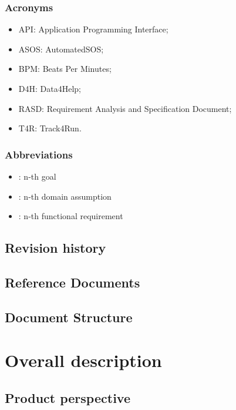 \documentclass{article}
\begin{document}
\subsubsection{Acronyms}
\begin{itemize}
\item API: Application Programming Interface;
\item ASOS: AutomatedSOS;
\item BPM: Beats Per Minutes;
\item D4H: Data4Help;
\item RASD: Requirement Analysis and Specification Document;
\item T4R: Track4Run.
\end{itemize}

\subsubsection{Abbreviations}
\begin{itemize}
		\item \begin{math}[Gn]\end{math}: n-th goal
		\item \begin{math}[Dn]\end{math}: n-th domain assumption 
		\item \begin{math}[Rn]\end{math}: n-th functional requirement
\end{itemize}

\subsection{Revision history}
\subsection{Reference Documents}
\subsection{Document Structure}

\section{Overall description}

\subsection{Product perspective}
\end{document}

